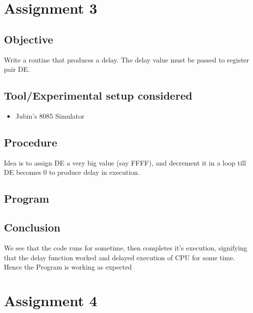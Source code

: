 \documentclass[a4paper]{article} %
\begin{document}
\section[Delay Procedure]{Assignment 3} %
    \subsection{Objective}
    Write a routine that produces a delay. The delay value must be passed to register pair DE.
    \subsection{Tool/Experimental setup considered}
        \begin{itemize}
            \item Jubin's 8085 Simulator
        \end{itemize}
    \subsection{Procedure}
        Idea is to assign DE a very big value (say FFFF), and decrement it in a loop till DE becomes 0 to produce delay in execution.
    \subsection{Program}
        
    \subsection{Conclusion}
        We see that the code runs for sometime, then completes it's execution, signifying that the delay function worked and delayed execution of CPU for some time.\\
        Hence the Program is working as expected
\newpage

\section[Move block of data from location X to location Y]{Assignment 4} %
\end{document}
